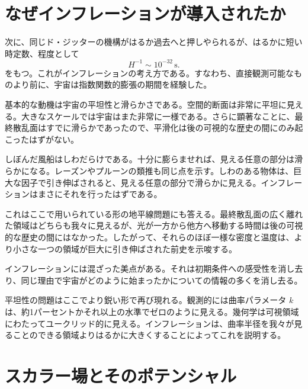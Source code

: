 \section{なぜインフレーションが導入されたか}

次に、同じド・ジッターの機構がはるか過去へと押しやられるが、はるかに短い時定数、程度として
\begin{equation}
H^{-1}\sim 10^{-32}\,\mathrm{s}.
\end{equation}
をもつ。これがインフレーションの考え方である。すなわち、直接観測可能なものより前に、宇宙は指数関数的膨張の期間を経験した。

基本的な動機は宇宙の平坦性と滑らかさである。空間的断面は非常に平坦に見える。大きなスケールでは宇宙はまた非常に一様である。さらに顕著なことに、最終散乱面はすでに滑らかであったので、平滑化は後の可視的な歴史の間にのみ起こったはずがない。

しぼんだ風船はしわだらけである。十分に膨らませれば、見える任意の部分は滑らかになる。レーズンやプルーンの類推も同じ点を示す。しわのある物体は、巨大な因子で引き伸ばされると、見える任意の部分で滑らかに見える。インフレーションはまさにそれを行ったはずである。

これはここで用いられている形の地平線問題にも答える。最終散乱面の広く離れた領域はどちらも我々に見えるが、光が一方から他方へ移動する時間は後の可視的な歴史の間にはなかった。したがって、それらのほぼ一様な密度と温度は、より小さな一つの領域が巨大に引き伸ばされた前史を示唆する。

インフレーションには混ざった美点がある。それは初期条件への感受性を消し去り、同じ理由で宇宙がどのように始まったかについての情報の多くを消し去る。

平坦性の問題はここでより鋭い形で再び現れる。観測的には曲率パラメータ \(k\) は、約1パーセントかそれ以上の水準でゼロのように見える。幾何学は可視領域にわたってユークリッド的に見える。インフレーションは、曲率半径を我々が見ることのできる領域よりはるかに大きくすることによってこれを説明する。

\begin{classroomqa}
\end{classroomqa}

\section{スカラー場とそのポテンシャル}

